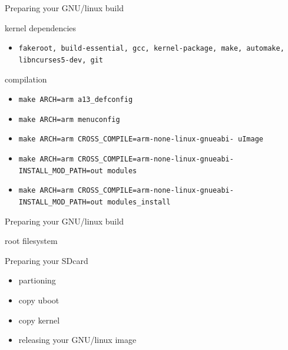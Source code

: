 \documentclass{beamer}
\begin{document}
 
 \begin{frame}{Preparing your GNU/linux build}
   \begin{block}{kernel dependencies}
     \begin{itemize}
     \item {\tt fakeroot, build-essential, gcc, kernel-package, make,
       automake, libncurses5-dev, git}
     \end{itemize} 
   \end{block}

   \begin{block}{compilation}
     \begin{itemize}
     \item {\tt make ARCH=arm a13\_defconfig}
     \item {\tt make ARCH=arm menuconfig}
     \item {\tt make ARCH=arm CROSS\_COMPILE=arm-none-linux-gnueabi-
       uImage}
     \item {\tt make ARCH=arm CROSS\_COMPILE=arm-none-linux-gnueabi-
       INSTALL\_MOD\_PATH=out modules}
     \item {\tt make ARCH=arm CROSS\_COMPILE=arm-none-linux-gnueabi-
       INSTALL\_MOD\_PATH=out modules\_install}
     \end{itemize} 
   \end{block}
 \end{frame}

 \begin{frame}{Preparing your GNU/linux build}
   \begin{block}{root filesystem}
   \end{block} 

   \begin{block}{Preparing your SDcard}
     \begin{itemize}
     \item partioning
     \item copy uboot
     \item copy kernel
     \item releasing your GNU/linux image
     \end{itemize}
   \end{block}
 \end{frame}
  
\end{document}
